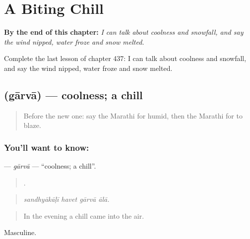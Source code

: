 
\chapter{A Biting Chill}
\label{ch:mr-a-biting-chill}

\begin{chapteropening}
\textbf{By the end of this chapter:} \emph{I can talk about coolness and snowfall, and say the wind nipped, water froze and snow melted.}

Complete the last lesson of chapter 437: I can talk about coolness and snowfall, and say the wind nipped, water froze and snow melted.
\end{chapteropening}

\section[\texorpdfstring{\mr{गारवा} (gārvā)}{गारवा (gārvā)}]{ (gārvā) — coolness; a chill}

\label{lesson:MR-C437-garva}



\begin{quote}
Before the new one: say the Marathi for humid, then the Marathi for to blaze.
\end{quote}

\subsection*{You'll want to know: }
\textbf{} — \emph{gārvā} — \textquotedblleft{}coolness; a chill\textquotedblright{}.

\begin{quote}
   .
\end{quote}

\begin{quote}
\emph{sandhyākāḷī havet gārvā ālā.}
\end{quote}

\begin{quote}
In the evening a chill came into the air.
\end{quote}

Masculine.

